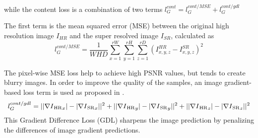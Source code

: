 \documentclass{article}
\begin{document}
while the content loss is a combination of two terms $l_{G}^{cont}= l_G^{cont/MSE} + l_G^{cont/gdl}$

The first term is the mean squared error (MSE) between the original high resolution image $I_{HR}$ and the super resolved image $I_{SR}$, calculated as
\begin{equation}\label{eq:loss_MSE}
	l_{G}^{cont/MSE} = \frac{1}{WHD} \sum_{x=1}^{rW} \sum_{y=1}^{rH}\sum_{z=1}^{rD}(I_{x,y,z}^{HR}-I_{x,y,z}^{SR})^2
\end{equation}

The pixel-wise MSE loss help to achieve high PSNR values, but tends to create blurry images. In order to improve the quality of the samples, an image gradient-based loss term is used as proposed in \cite{couprie:video}.
\begin{equation}\label{eq:loss_gdl}
l_{G}^{cont/gdl} = ||\nabla I\textsubscript{HR}_{x}| - |\nabla I\textsubscript{SR}_{x}||^2 + ||\nabla I\textsubscript{HR}_{y}| - |\nabla I\textsubscript{SR}_{y}||^2 + ||\nabla I\textsubscript{HR}_{z}| - |\nabla I\textsubscript{SR}_{z}||^2
\end{equation}
This Gradient Difference Loss (GDL) sharpens the image prediction by penalizing the differences of image gradient predictions. 


\end{document}

